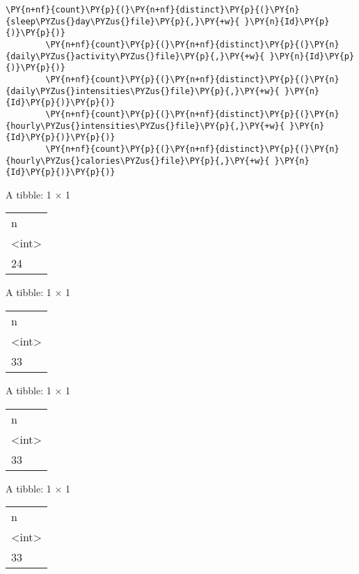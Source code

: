 \begin{tcolorbox}[breakable, size=fbox, boxrule=1pt, pad at break*=1mm,colback=cellbackground, colframe=cellborder]
    \begin{Verbatim}[commandchars=\\\{\}]
        \PY{n+nf}{count}\PY{p}{(}\PY{n+nf}{distinct}\PY{p}{(}\PY{n}{sleep\PYZus{}day\PYZus{}file}\PY{p}{,}\PY{+w}{ }\PY{n}{Id}\PY{p}{)}\PY{p}{)}
        \PY{n+nf}{count}\PY{p}{(}\PY{n+nf}{distinct}\PY{p}{(}\PY{n}{daily\PYZus{}activity\PYZus{}file}\PY{p}{,}\PY{+w}{ }\PY{n}{Id}\PY{p}{)}\PY{p}{)}
        \PY{n+nf}{count}\PY{p}{(}\PY{n+nf}{distinct}\PY{p}{(}\PY{n}{daily\PYZus{}intensities\PYZus{}file}\PY{p}{,}\PY{+w}{ }\PY{n}{Id}\PY{p}{)}\PY{p}{)}
        \PY{n+nf}{count}\PY{p}{(}\PY{n+nf}{distinct}\PY{p}{(}\PY{n}{hourly\PYZus{}intensities\PYZus{}file}\PY{p}{,}\PY{+w}{ }\PY{n}{Id}\PY{p}{)}\PY{p}{)}
        \PY{n+nf}{count}\PY{p}{(}\PY{n+nf}{distinct}\PY{p}{(}\PY{n}{hourly\PYZus{}calories\PYZus{}file}\PY{p}{,}\PY{+w}{ }\PY{n}{Id}\PY{p}{)}\PY{p}{)}
    \end{Verbatim}
\end{tcolorbox}

A tibble: 1 × 1
\begin{tabular}{l}
    n     \\
    <int> \\
    \hline
    24    \\
\end{tabular}



A tibble: 1 × 1
\begin{tabular}{l}
    n     \\
    <int> \\
    \hline
    33    \\
\end{tabular}



A tibble: 1 × 1
\begin{tabular}{l}
    n     \\
    <int> \\
    \hline
    33    \\
\end{tabular}



A tibble: 1 × 1
\begin{tabular}{l}
    n     \\
    <int> \\
    \hline
    33    \\
\end{tabular}



